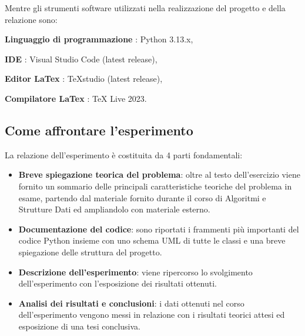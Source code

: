 		Mentre gli strumenti software utilizzati nella realizzazione del progetto e della relazione sono:
		
		\begin{DESC}{1}
			\item [\textbf{Linguaggio di programmazione}]: Python 3.13.x,
			\item[\textbf{IDE}]: Visual Studio Code (latest release),
			\item[\textbf{Editor LaTex}]: TeXstudio (latest release),
			\item[\textbf{Compilatore LaTex}]: TeX Live 2023. 
		\end{DESC}
			
	\subsection{Come affrontare l'esperimento}
		La relazione dell'esperimento è costituita da 4 parti fondamentali:
		
		\begin{itemize}
			\item \textbf{Breve spiegazione teorica del problema}: oltre al testo dell'esercizio viene fornito un sommario delle principali caratteristiche teoriche del problema in esame, partendo dal materiale fornito durante il corso di Algoritmi e Strutture Dati ed ampliandolo con materiale esterno.
			\item \textbf{Documentazione del codice}: sono riportati i frammenti più importanti del codice Python insieme con uno schema UML di tutte le classi e una breve spiegazione delle struttura del progetto.
			\item \textbf{Descrizione dell'esperimento}: viene ripercorso lo svolgimento dell'esperimento con l'esposizione dei risultati ottenuti.
			\item \textbf{Analisi dei risultati e conclusioni}: i dati ottenuti nel corso dell'esperimento vengono messi in relazione con i risultati teorici attesi ed esposizione di una tesi conclusiva.
		\end{itemize}
		